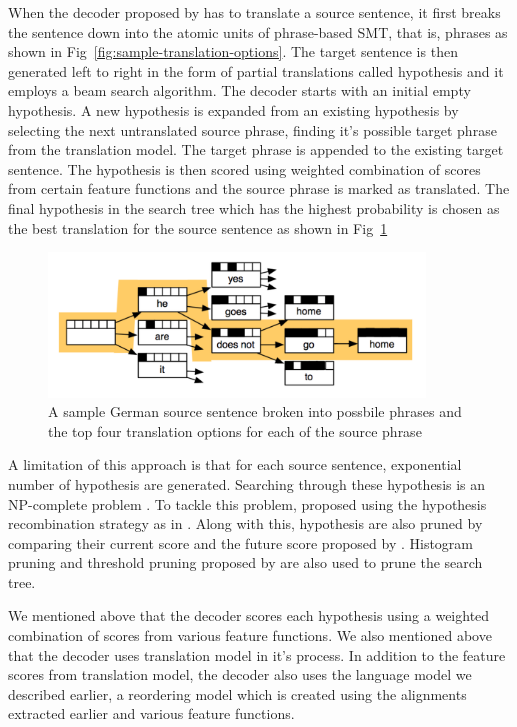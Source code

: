 When the decoder proposed by \cite{Koehn2003} has to translate a source sentence, it first breaks the sentence down into the atomic units of phrase-based SMT, that is, phrases as shown in Fig~\ref{fig:sample-translation-options}. The target sentence is then generated left to right in the form of partial translations called hypothesis and it employs a beam search algorithm. The decoder starts with an initial empty hypothesis. A new hypothesis is expanded from an existing hypothesis by selecting the next untranslated source phrase, finding it's possible target phrase from the translation model. The target phrase is appended to the existing target sentence. The hypothesis is then scored using weighted combination of scores from certain feature functions and the source phrase is marked as translated. The final hypothesis in the search tree which has the highest probability is chosen as the best translation for the source sentence as shown in Fig~\ref{fig:sample-search}

\begin{figure}[h]
	\includegraphics[width=10cm]{files/images/sample-search}
	\centering
	\caption{A sample German source sentence broken into possbile phrases and the top four translation options for each of the source phrase \cite{Koehn2009}}
	\label{fig:sample-search}
\end{figure}

A limitation of this approach is that for each source sentence, exponential number of hypothesis are generated. Searching through these hypothesis is an NP-complete problem \cite{Knight1999}. To tackle this problem, \cite{Koehn2003} proposed using the hypothesis recombination strategy as in \cite{Och2001}. Along with this, hypothesis are also pruned by comparing their current score and the future score proposed by \cite{Koehn2003}. Histogram pruning and threshold pruning proposed by \cite{Koehn2004Pharaoh} are also used to prune the search tree.

We mentioned above that the decoder scores each hypothesis using a weighted combination of scores from various feature functions. We also mentioned above that the decoder uses translation model in it's process. In addition to the feature scores from translation model, the decoder also uses the language model we described earlier, a reordering model which is created using the alignments extracted earlier and various feature functions.

